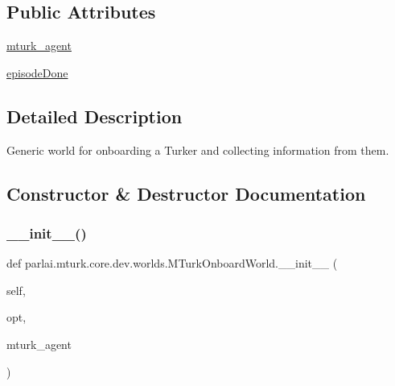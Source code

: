 \subsection*{Public Attributes}
\begin{DoxyCompactItemize}
\item 
\hyperlink{classparlai_1_1mturk_1_1core_1_1dev_1_1worlds_1_1MTurkOnboardWorld_ad7fca9004be424325d8f85100d7684e9}{mturk\+\_\+agent}
\item 
\hyperlink{classparlai_1_1mturk_1_1core_1_1dev_1_1worlds_1_1MTurkOnboardWorld_ad8409ee17d78335e5db64edc552a7969}{episode\+Done}
\end{DoxyCompactItemize}


\subsection{Detailed Description}
\begin{DoxyVerb}Generic world for onboarding a Turker and collecting information from them.
\end{DoxyVerb}
 

\subsection{Constructor \& Destructor Documentation}
\mbox{\label{classparlai_1_1mturk_1_1core_1_1dev_1_1worlds_1_1MTurkOnboardWorld_ae9bb71f7075a4b244dff5be6c83a312d}} 
\subsubsection{\texorpdfstring{\+\_\+\+\_\+init\+\_\+\+\_\+()}{\_\_init\_\_()}}
{\footnotesize\ttfamily def parlai.\+mturk.\+core.\+dev.\+worlds.\+M\+Turk\+Onboard\+World.\+\_\+\+\_\+init\+\_\+\+\_\+ (\begin{DoxyParamCaption}\item[{}]{self,  }\item[{}]{opt,  }\item[{}]{mturk\+\_\+agent }\end{DoxyParamCaption})}

